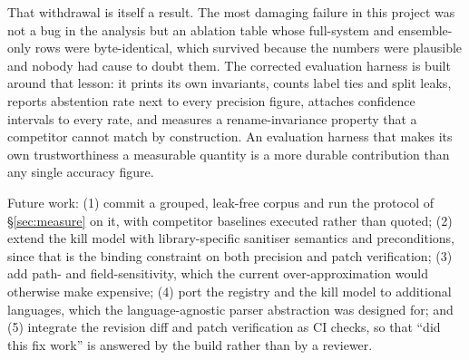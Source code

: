 \documentclass[12pt,a4paper]{article}
\begin{document}
That withdrawal is itself a result. The most damaging failure in this project was
not a bug in the analysis but an ablation table whose full-system and
ensemble-only rows were byte-identical, which survived because the numbers were
plausible and nobody had cause to doubt them. The corrected evaluation harness is
built around that lesson: it prints its own invariants, counts label ties and
split leaks, reports abstention rate next to every precision figure, attaches
confidence intervals to every rate, and measures a rename-invariance property
that a competitor cannot match by construction. An evaluation harness that makes
its own trustworthiness a measurable quantity is a more durable contribution than
any single accuracy figure.

Future work: (1) commit a grouped, leak-free corpus and run the protocol of
\S\ref{sec:measure} on it, with competitor baselines executed rather than quoted;
(2) extend the kill model with library-specific sanitiser semantics and
preconditions, since that is the binding constraint on both precision and patch
verification; (3) add path- and field-sensitivity, which the current
over-approximation would otherwise make expensive; (4) port the registry and the
kill model to additional languages, which the language-agnostic parser
abstraction was designed for; and (5) integrate the revision diff and patch
verification as CI checks, so that ``did this fix work'' is answered by the build
rather than by a reviewer.



\end{document}
